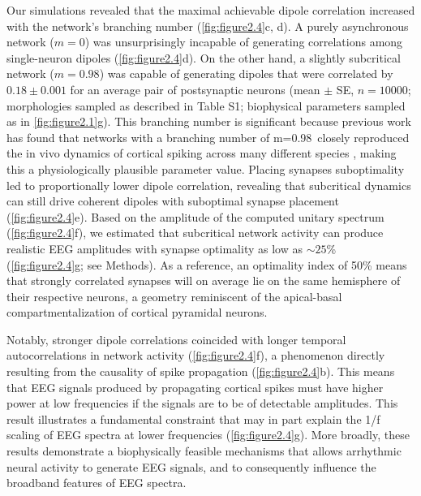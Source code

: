 Our simulations revealed that the maximal achievable dipole correlation increased with the network’s branching number (\autoref{fig:figure2.4}c, d). A purely asynchronous network ($m=0$) was unsurprisingly incapable of generating correlations among single-neuron dipoles (\autoref{fig:figure2.4}d). On the other hand, a slightly subcritical network ($m=0.98$) was capable of generating dipoles that were correlated by $0.18 \pm 0.001$ for an average pair of postsynaptic neurons (mean $\pm$ SE, $n=10000$; morphologies sampled as described in Table S1; biophysical parameters sampled as in \autoref{fig:figure2.1}g). This branching number is significant because previous work has found that networks with a branching number of m=0.98\ closely reproduced the in vivo dynamics of cortical spiking across many different species \cite{Suryadi2022, Wilting2019}, making this a physiologically plausible parameter value. Placing synapses suboptimality led to proportionally lower dipole correlation, revealing that subcritical dynamics can still drive coherent dipoles with suboptimal synapse placement (\autoref{fig:figure2.4}e). Based on the amplitude of the computed unitary spectrum (\autoref{fig:figure2.4}f), we estimated that subcritical network activity can produce realistic EEG amplitudes with synapse optimality as low as ${\sim}25$\% (\autoref{fig:figure2.4}g; see Methods). As a reference, an optimality index of 50\% means that strongly correlated synapses will on average lie on the same hemisphere of their respective neurons, a geometry reminiscent of the apical-basal compartmentalization of cortical pyramidal neurons. 

Notably, stronger dipole correlations coincided with longer temporal autocorrelations in network activity (\autoref{fig:figure2.4}f), a phenomenon directly resulting from the causality of spike propagation (\autoref{fig:figure2.4}b). This means that EEG signals produced by propagating cortical spikes must have higher power at low frequencies if the signals are to be of detectable amplitudes. This result illustrates a fundamental constraint that may in part explain the 1/f scaling of EEG spectra at lower frequencies (\autoref{fig:figure2.4}g). More broadly, these results demonstrate a biophysically feasible mechanisms that allows arrhythmic neural activity to generate EEG signals, and to consequently influence the broadband features of EEG spectra.

